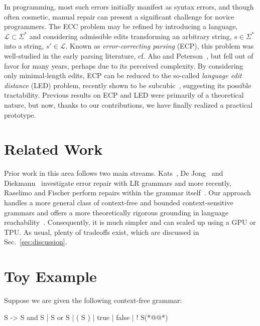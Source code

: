 \documentclass[sigplan,nonacm]{acmart}\settopmatter{printfolios=false,printccs=false,printacmref=false}
\begin{document}
In programming, most such errors initially manifest as syntax errors, and though often cosmetic, manual repair can present a significant challenge for novice programmers. The ECC problem may be refined by introducing a language, $\mathcal{L} \subset \Sigma^*$ and considering admissible edits transforming an arbitrary string, $s \in \Sigma^*$ into a string, $s'\in\mathcal{L}$. Known as \textit{error-correcting parsing} (ECP), this problem was well-studied in the early parsing literature, cf. Aho and Peterson~\cite{aho1972minimum}, but fell out of favor for many years, perhaps due to its perceived complexity. By considering only minimal-length edits, ECP can be reduced to the so-called \textit{language edit distance} (LED) problem, recently shown to be subcubic~\cite{bringmann2019truly}, suggesting its possible tractability. Previous results on ECP and LED were primarily of a theoretical nature, but now, thanks to our contributions, we have finally realized a practical prototype.

\section{Related Work}

Prior work in this area follows two main streams. Kats~\cite{kats2009providing}, De Jong~\cite{de2012automated} and Diekmann~\cite{diekmann2018dont} investigate error repair with LR grammars and more recently, Raselimo and Fischer perform repairs within the grammar itself~\cite{raselimo2021automatic}. Our approach handles a more general class of context-free and bounded context-sensitive grammars and offers a more theoretically rigorous grounding in language reachability~\cite{melski1997interconvertbility}. Consequently, it is much simpler and can scaled up using a GPU or TPU. As usual, plenty of tradeoffs exist, which are discussed in Sec.~\ref{sec:discussion}.

\section{Toy Example}

Suppose we are given the following context-free grammar:

\begin{tidyinput}
S -> S and S | S or S | ( S ) | true | false | ! S(*@\caret{ }@*)
\end{tidyinput}

\end{document}
